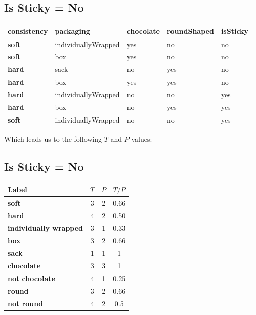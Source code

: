 \documentclass[12pt]{scrartcl}
\begin{document}
\subsection{Is Sticky = No}
\begin{table}[H]
    \centering
    \begin{tabular}{|l|l|l|l|l|}
        \hline
        \textbf{consistency} & \textbf{packaging}  & \textbf{chocolate} & \textbf{roundShaped} & \textbf{isSticky} \\ \hline
        \textbf{soft}        & individuallyWrapped & yes                & no                   & no \\
        \textbf{soft}        & box                 & yes                & no                   & no \\
        \textbf{hard}        & sack                & no                 & yes                  & no \\
        \textbf{hard}        & box                 & yes                & yes                  & no \\
        \textbf{hard}        & individuallyWrapped & no                 & no                   & yes \\
        \textbf{hard}        & box                 & no                 & yes                  & yes \\
        \textbf{soft}        & individuallyWrapped & no                 & no                   & yes \\\hline
    \end{tabular}
\end{table}

Which leads us to the following $T$ and $P$ values:

\subsection{Is Sticky = No}
\begin{table}[H]
    \centering
    \begin{tabular}{|l|c|c|c|}
        \hline
        \textbf{Label}                 & $T$ & $P$ & $T/P$ \\\hline
        \textbf{soft}                 & 3   & 2   & 0.66\\
        \textbf{hard}                 & 4   & 2   & 0.50\\
        \textbf{individually wrapped} & 3   & 1   & 0.33\\
        \textbf{box}                  & 3   & 2   & 0.66\\
        \textbf{sack}                 & 1   & 1   & 1\\
        \textbf{chocolate}            & 3   & 3   & 1\\
        \textbf{not chocolate}        & 4   & 1   & 0.25\\
        \textbf{round}                & 3   & 2   & 0.66\\
        \textbf{not round}            & 4   & 2   & 0.5\\\hline
    \end{tabular}
\end{table}
\end{document}
